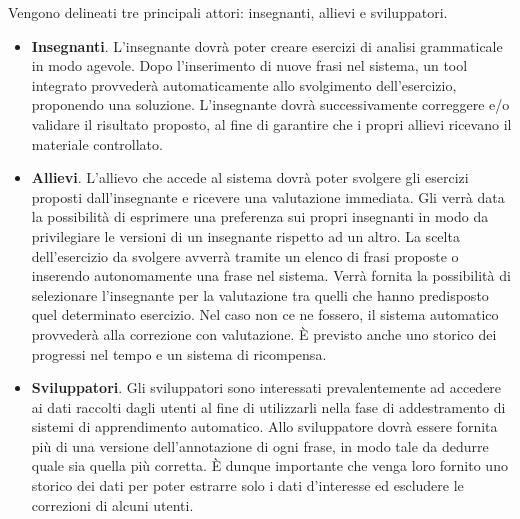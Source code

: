 Vengono delineati tre principali attori: insegnanti, allievi e sviluppatori.
\begin{itemize}
	\item \textbf{Insegnanti}. L'insegnante dovrà poter creare esercizi
	 di analisi grammaticale in modo agevole. Dopo l'inserimento di nuove frasi
	 nel sistema, un tool integrato provvederà automaticamente allo svolgimento
	 dell'esercizio, proponendo una soluzione. L'insegnante dovrà 
	 successivamente correggere e/o validare il risultato proposto, al fine di
	 garantire che i propri allievi ricevano il materiale controllato.
	\item \textbf{Allievi}.
	L'allievo che accede al sistema dovrà poter svolgere gli esercizi proposti
	dall'insegnante e ricevere una valutazione immediata. Gli verrà data la
	possibilità di esprimere una preferenza sui propri insegnanti in modo da
	privilegiare le versioni di un insegnante rispetto ad un altro. La scelta
	dell'esercizio da svolgere avverrà tramite un elenco di frasi proposte o
	inserendo autonomamente una frase nel sistema. Verrà fornita la possibilità
	di selezionare l'insegnante per la valutazione tra quelli che hanno
	predisposto quel determinato esercizio. Nel caso non ce ne fossero, il
	sistema automatico provvederà alla correzione con valutazione. \`E previsto
    anche uno storico dei progressi nel tempo e un sistema di ricompensa.
	\item \textbf{Sviluppatori}.
	Gli sviluppatori sono interessati prevalentemente ad accedere ai dati
	raccolti dagli utenti al fine di utilizzarli nella fase di addestramento di
	sistemi di apprendimento automatico. Allo sviluppatore dovrà essere fornita
	più di una versione dell'annotazione di ogni frase, in modo tale da dedurre
	quale sia quella più corretta. \`E dunque importante che venga loro fornito
	uno storico dei dati per poter estrarre solo i dati d'interesse ed
	escludere le correzioni di alcuni utenti. 
\end{itemize}
